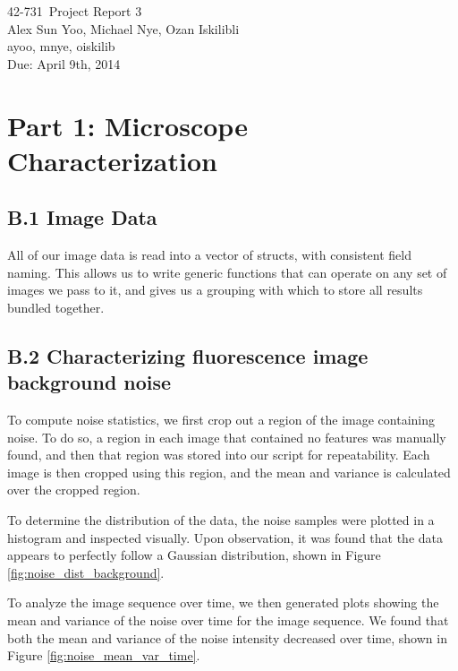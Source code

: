 \documentclass{article}
\newcommand{\hmwkTitle}{Project Report 3}
\newcommand{\hmwkDueDate}{April 9th, 2014}
\newcommand{\hmwkClass}{42-731}
\newcommand{\hmwkAuthor}{Alex Sun Yoo, Michael Nye, Ozan Iskilibli}
\newcommand{\hmwkEmail}{ayoo, mnye, oiskilib}
\newcommand{\hmwkCollaborators}{}
\begin{document}
\thispagestyle{plain}
\begin{center}
{\Large \hmwkClass\ \hmwkTitle} \\
\hmwkAuthor \\
\hmwkEmail \\
\ifthenelse{\equal{\hmwkCollaborators}{}}{}{Collaborators: \hmwkCollaborators\\}
Due: \hmwkDueDate\\
\end{center}

\section*{Part 1: Microscope Characterization}

\subsection*{B.1 Image Data}

All of our image data is read into a vector of structs, with consistent field naming. This allows us to write generic functions that can operate on any set of images we pass to it, and gives us a grouping with which to store all results bundled together.


\subsection*{B.2 Characterizing fluorescence image background noise}

To compute noise statistics, we first crop out a region of the image containing noise. To do so, a region in each image that contained no features was manually found, and then that region was stored into our script for repeatability. Each image is then cropped using this region, and the mean and variance is calculated over the cropped region.

To determine the distribution of the data, the noise samples were plotted in a histogram and inspected visually. Upon observation, it was found that the data appears to perfectly follow a Gaussian distribution, shown in Figure \ref{fig:noise_dist_background}.

To analyze the image sequence over time, we then generated plots showing the mean and variance of the noise over time for the image sequence. We found that both the mean and variance of the noise intensity decreased over time, shown in Figure \ref{fig:noise_mean_var_time}.
\end{document}
